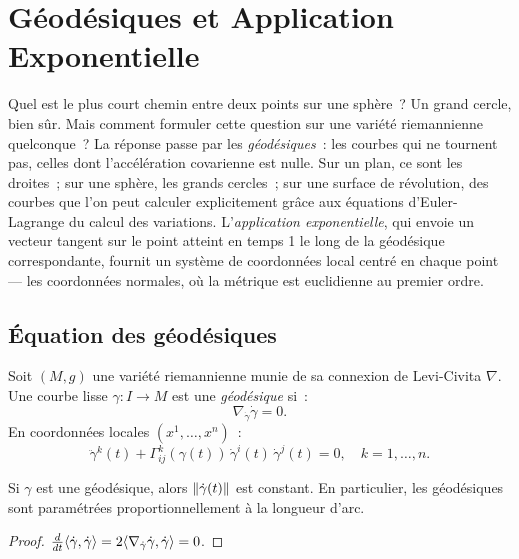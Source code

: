 \chapter{G\'eod\'esiques et Application Exponentielle}
\label{ch:geodesiques}

Quel est le plus court chemin entre deux points sur une sph\`ere~? Un grand cercle, bien s\^ur. Mais comment formuler cette question sur une vari\'et\'e riemannienne quelconque~? La r\'eponse passe par les \emph{g\'eod\'esiques}~: les courbes qui ne tournent pas, celles dont l'acc\'el\'eration covarienne est nulle. Sur un plan, ce sont les droites~; sur une sph\`ere, les grands cercles~; sur une surface de r\'evolution, des courbes que l'on peut calculer explicitement gr\^ace aux \'equations d'Euler-Lagrange du calcul des variations. L'\emph{application exponentielle}, qui envoie un vecteur tangent sur le point atteint en temps 1 le long de la g\'eod\'esique correspondante, fournit un syst\`eme de coordonn\'ees local centr\'e en chaque point --- les coordonn\'ees normales, o\`u la m\'etrique est euclidienne au premier ordre.

\section{\'Equation des g\'eod\'esiques}

\begin{definition}
Soit $(M, g)$ une vari\'et\'e riemannienne munie de sa connexion de Levi-Civita
$\nabla$. Une courbe lisse $\gamma : I \to M$ est une \emph{g\'eod\'esique} si~:
\[
    \nabla_{\dot\gamma}\dot\gamma = 0.
\]
En coordonn\'ees locales $(x^1, \ldots, x^n)$~:
\[
    \ddot\gamma^k(t) + \Gamma^k_{ij}(\gamma(t))\, \dot\gamma^i(t)\, \dot\gamma^j(t) = 0,
    \quad k = 1, \ldots, n.
\]
\end{definition}

\begin{proposition}
Si $\gamma$ est une g\'eod\'esique, alors $\left\| \dot\gamma(t) \right\|$ est constant. En
particulier, les g\'eod\'esiques sont param\'etr\'ees proportionnellement \`a la longueur
d'arc.
\end{proposition}

\begin{proof}
$\frac{d}{dt}\langle \dot\gamma, \dot\gamma \rangle = 2\langle \nabla_{\dot\gamma}\dot\gamma, \dot\gamma \rangle
= 0$.
\end{proof}

